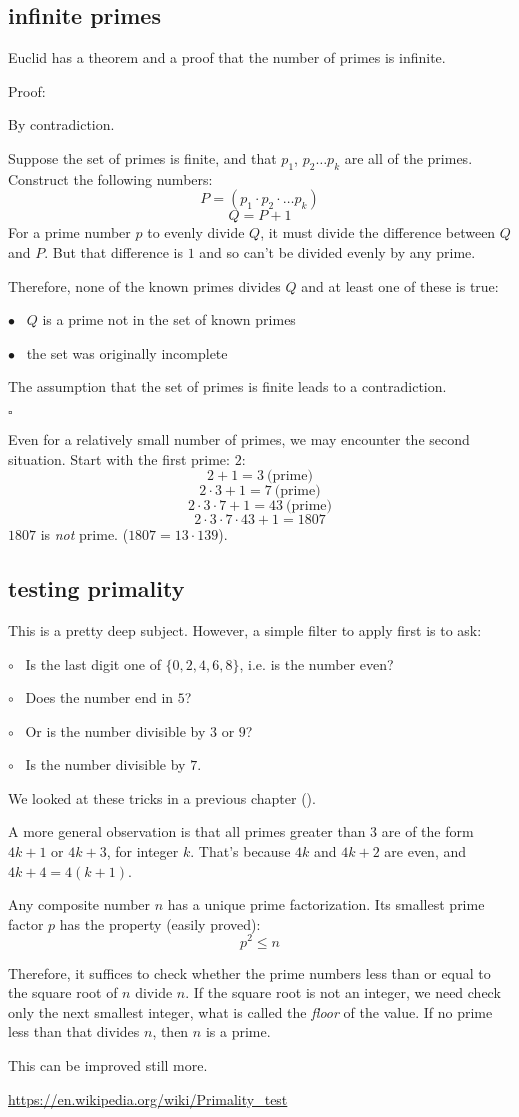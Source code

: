 \documentclass[11pt, oneside]{article}
\begin{document}
\subsection*{infinite primes}

Euclid has a theorem and a proof that the number of primes is infinite.

Proof:

By contradiction.

Suppose the set of primes is finite, and that $p_1$, $p_2 \dots p_k$ are all of the primes.  Construct the following numbers:
\[ P = (p_1 \cdot p_2 \cdot \dots p_k)  \]
\[ Q = P + 1 \]
For a prime number $p$ to evenly divide $Q$, it must divide the difference between $Q$ and $P$.  But that difference is $1$ and so can't be divided evenly by any prime.

Therefore, none of the known primes divides $Q$ and at least one of these is true:

$\bullet$ \  $Q$ is a prime not in the set of known primes

$\bullet$ \ the set was originally incomplete

The assumption that the set of primes is finite leads to a contradiction.

$\square$

Even for a relatively small number of primes, we may encounter the second situation.  Start with the first prime:  $2$:
\[ 2 + 1 = 3 \ \text{(prime)} \]
\[ 2 \cdot 3 + 1 = 7 \ \text{(prime)}  \]
\[ 2 \cdot 3 \cdot 7 +1 = 43 \ \text{(prime)}  \]
\[ 2 \cdot 3 \cdot 7 \cdot 43 + 1 =  1807 \]
$1807$ is \emph{not} prime.  ($1807 = 13 \cdot 139$).

\subsection*{testing primality}
This is a pretty deep subject.  However, a simple filter to apply first is to ask:  

$\circ$ \ Is the last digit one of $\{ 0,2,4,6,8 \}$, i.e. is the number even?  

$\circ$ \ Does the number end in $5$?  

$\circ$ \ Or is the number divisible by $3$ or $9$?

$\circ$ \ Is the number divisible by $7$.

We looked at these tricks in a previous chapter ().


A more general observation is that all primes greater than $3$ are of the form $4k + 1$ or $4k + 3$, for integer $k$.  That's because $4k$ and $4k + 2$ are even, and $4k + 4 = 4(k + 1)$.

Any composite number $n$ has a unique prime factorization.  Its smallest prime factor $p$ has the property (easily proved):
\[ p^2 \le n \]

Therefore, it suffices to check whether the prime numbers less than or equal to the square root of $n$ divide $n$.  If the square root is not an integer, we need check only the next smallest integer, what is called the \emph{floor} of the value.  If no prime less than that divides $n$, then $n$ is a prime.

This can be improved still more.

\url{https://en.wikipedia.org/wiki/Primality_test}
\end{document}
